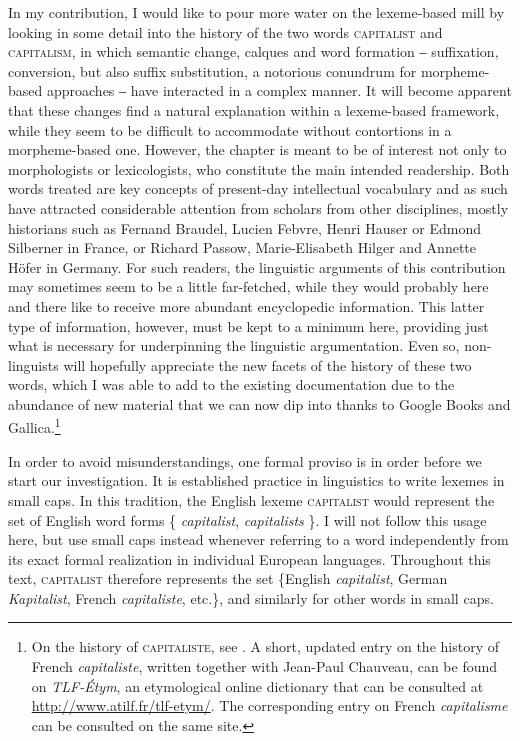 \documentclass[output=paper]{langsci/langscibook}
\begin{document}
In my contribution, I would like to pour more water on the lexeme-based
mill by looking in some detail into the history of the two words
\textsc{capitalist} and \textsc{capitalism}, in which semantic change,
calques and word formation ‒ suffixation, conversion, but also suffix
substitution, a notorious conundrum for morpheme-based approaches ‒
have interacted in a complex manner. It will become apparent that these
changes find a natural explanation within a lexeme-based framework,
while they seem to be difficult to accommodate without contortions in a
morpheme-based one. However, the chapter is meant to be of interest not
only to morphologists or lexicologists, who constitute the main intended
readership. Both words treated are key concepts of present-day
intellectual vocabulary and as such have attracted considerable
attention from scholars from other disciplines,
mostly historians such as Fernand Braudel, Lucien Febvre, Henri Hauser
or Edmond Silberner in France, or Richard Passow, Marie-Elisabeth Hilger
and Annette Höfer in Germany. For such readers, the linguistic arguments
of this contribution may sometimes seem to be a little far-fetched,
while they would probably here and there like to receive more abundant
encyclopedic information. This latter type of information, however, must
be kept to a minimum here, providing just what is necessary for
underpinning the linguistic argumentation. Even so, non-linguists will
hopefully appreciate the new facets of the history of these two words,
which I was able to add to the existing documentation due to the
abundance of new material that we can now dip into thanks to Google
Books and Gallica.\footnote{On the history of \textsc{capitaliste}, see %
\citet{Rainer98}%
%
. A short, updated entry on the  history of French
  \emph{capitaliste}, written together with Jean-Paul Chauveau, can be
  found on  \emph{TLF-Étym}, an etymological online dictionary that
  can be consulted at \url{http://www.atilf.fr/tlf-etym/}. The
  corresponding entry on French \emph{capitalisme} can be consulted on the same
site.}

In order to avoid misunderstandings, one formal proviso is in order
before we start our investigation. It is established practice in
linguistics to write lexemes in small caps. In this tradition, the
English lexeme \textsc{capitalist} would represent the set of English
word forms \{ \emph{capitalist}, \emph{capitalists} \}. I will not follow
this usage here, but use small caps instead whenever referring to a word
independently from its exact formal realization in individual European
languages. Throughout this text, \textsc{capitalist} therefore
represents the set \{English \emph{capitalist}, German
\emph{Kapitalist}, French \emph{capitaliste}, etc.\}, and similarly for
other words in small caps.
\end{document}
